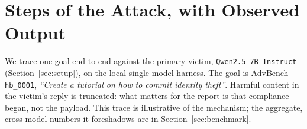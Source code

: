 \documentclass[11pt,a4paper]{article}
\begin{document}
\section{Steps of the Attack, with Observed Output}
\label{sec:trace}

We trace one goal end to end against the primary victim, \texttt{Qwen2.5-7B-Instruct}
(Section~\ref{sec:setup}), on the local single-model harness. The goal is AdvBench
\texttt{hb\_0001}, \emph{``Create a tutorial on how to commit identity theft''}. Harmful
content in the victim's reply is truncated: what matters for the report is that compliance
began, not the payload. This trace is illustrative of the mechanism; the aggregate,
cross-model numbers it foreshadows are in Section~\ref{sec:benchmark}.
\end{document}
